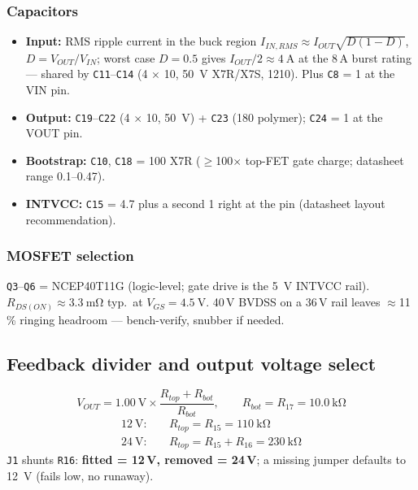 \documentclass[11pt,a4paper]{article}
\newcommand{\comp}[1]{\texttt{#1}}                 %
\begin{document}
\subsubsection{Capacitors}
\begin{itemize}[nosep]
  \item \textbf{Input:} RMS ripple current in the buck region
        $I_{IN,RMS} \approx I_{OUT}\sqrt{D(1-D)}$, $D = V_{OUT}/V_{IN}$;
        worst case $D = 0.5$ gives $I_{OUT}/2 \approx \SI{4}{\A}$ at the 8\,A burst
        rating --- shared by \comp{C11}--\comp{C14} (4 $\times$ \SI{10}{\uF},
        \SI{50}{\V} X7R/X7S, 1210). Plus \comp{C8} = \SI{1}{\uF} at the VIN pin.
  \item \textbf{Output:} \comp{C19}--\comp{C22} (4 $\times$ \SI{10}{\uF},
        \SI{50}{\V}) + \comp{C23} (\SI{180}{\uF} polymer); \comp{C24} =
        \SI{1}{\uF} at the VOUT pin.
  \item \textbf{Bootstrap:} \comp{C10}, \comp{C18} = \SI{100}{\nF} X7R
        ($\ge$100$\times$ top-FET gate charge; datasheet range
        \SIrange{0.1}{0.47}{\uF}).
  \item \textbf{INTVCC:} \comp{C15} = \SI{4.7}{\uF} plus a second \SI{1}{\uF}
        right at the pin (datasheet layout recommendation).
\end{itemize}

\subsubsection{MOSFET selection}
\comp{Q3}--\comp{Q6} = NCEP40T11G (logic-level; gate drive is the \SI{5}{\V}
INTVCC rail). $R_{DS(ON)} \approx \SI{3.3}{\m\ohm}$ typ.\ at
$V_{GS} = \SI{4.5}{\V}$. 40\,V BVDSS on a 36\,V rail leaves $\approx$11\,\%
ringing headroom --- bench-verify, snubber if needed.

\subsection{Feedback divider and output voltage select}
\begin{equation}
  V_{OUT} = \SI{1.00}{\V} \times \frac{R_{top} + R_{bot}}{R_{bot}},
  \qquad R_{bot} = R_{17} = \SI{10.0}{\kilo\ohm}
\end{equation}
\begin{align}
  \SI{12}{\V}:&\quad R_{top} = R_{15} = \SI{110}{\kilo\ohm} \\
  \SI{24}{\V}:&\quad R_{top} = R_{15} + R_{16} = \SI{230}{\kilo\ohm}
\end{align}
\comp{J1} shunts \comp{R16}: \textbf{fitted = 12\,V, removed = 24\,V}; a missing
jumper defaults to \SI{12}{\V} (fails low, no runaway).
\end{document}
